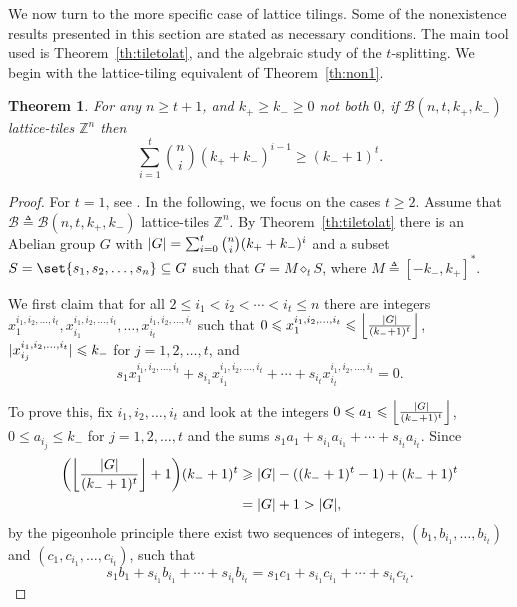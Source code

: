 \documentclass[sort&compress]{elsarticle}
\DeclarePairedDelimiter\abs{\lvert}{\rvert}
\DeclarePairedDelimiter\floor{\lfloor}{\rfloor}
\DeclarePairedDelimiter\parenv{\lparen}{\rparen}
\newcommand{\cB}{\mathcal{B}}
\renewcommand{\leq}{\leqslant}
\renewcommand{\geq}{\geqslant}
\newtheorem{theorem}{Theorem}
\newcommand{\Z}{\mathbb{Z}}
\newcommand{\vx}{\mathbf{x}}
\DeclareMathOperator{\wt}{wt}
\newcommand{\kp}{k_+}
\newcommand{\km}{k_-}
\newcommand{\BALL}{{\mathcal B}(n,t,\kp,\km)}
\newcommand{\eqdef}{\triangleq}
\newcommand{\splt}{\diamond}
\begin{document}
We now turn to the more specific case of lattice tilings. Some of the
nonexistence results presented in this section are stated as necessary
conditions. The main tool used is Theorem~\ref{th:tiletolat}, and the
algebraic study of the $t$-splitting. 
We begin with the lattice-tiling
equivalent of Theorem~\ref{th:non1}.

\begin{theorem}
For any $n\geq t+1$, and $\kp\geq \km\geq 0$ not both $0$, if $\BALL$ lattice-tiles $\Z^n$ then
\[\sum_{i=1}^t \binom{n}{i}(\kp+\km)^{i-1} \geq (\km+1)^t.\]
\end{theorem}

\begin{proof}  For $t=1$, see \cite[Theorem 11]{Sch12}. In the following, we focus on  the cases  $t\geq 2$.
  Assume that $\cB\eqdef\cB(n,t,\kp,\km)$ lattice-tiles $\Z^n$. By
  Theorem~\ref{th:tiletolat} there is an Abelian group $G$ with
  $\abs{G}= \sum_{i=0}^t \binom{n}{i} (\kp+\km)^i$ and a subset
  $S=\set{s_1,s_2,\ldots, s_n} \subseteq G$ such that $G=M\splt_t S$,
  where $M\eqdef[-\km,\kp]^*$.


  We first claim that for all $2\leq i_1<i_2<\cdots <i_t \leq n$ there
  are integers $x_1^{i_1,i_2,\ldots, i_t}, x_{i_1}^{i_1,i_2,\ldots,
    i_t}, \ldots, x_{i_t}^{i_1,i_2,\ldots, i_t}$ such that $0 
  \leq x_1^{i_1,i_2,\ldots, i_t} \leq \floor*{
    \frac{\abs{G}}{(\km+1)^t}}$, $\abs{x_{i_j}^{i_1,i_2,\ldots,i_t}}\leq \km$
  for $j=1,2,\ldots,t$, and
  \[s_1x_1^{i_1,i_2,\ldots, i_t}+s_{i_1} x_{i_1}^{i_1,i_2,\ldots, i_t} +\cdots + s_{i_t} x_{i_t}^{i_1,i_2,\ldots, i_t} =0.\]

  To prove this, fix $i_1,i_2,\ldots, i_t$ and look at the integers $0
  \leq a_1 \leq \floor*{ \frac{\abs{G}}{(\km+1)^t}}$, $0\leq a_{i_j}\leq
  \km$ for $j=1,2,\ldots,t$ and the sums $s_1a_1+s_{i_1}a_{i_1}+\cdots
  +s_{i_t}a_{i_t}$. Since
  \begin{align*}
    \parenv*{  \floor*{  \frac{\abs{G}}{(\km+1)^t}} +1 }(\km+1)^t &\geq \abs{G} - ((\km+1)^t-1) +(\km+1)^t \\
    &=\abs{G}+1 >\abs{G},
  \end{align*}
  by the pigeonhole principle there exist two sequences of integers,
  $(b_1,b_{i_1}, \ldots, b_{i_t})$ and $(c_1,c_{i_1}, \ldots,
  c_{i_t})$, such that
  \[s_1b_1+s_{i_1}b_{i_1}+\cdots +s_{i_t}b_{i_t} =
  s_1c_1+s_{i_1}c_{i_1}+\cdots +s_{i_t}c_{i_t}.\]


\end{proof}
\end{document}
